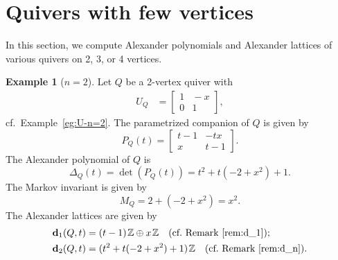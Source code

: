 \documentclass[11pt, letterpaper]{amsart}
\theoremstyle{definition}
\newtheorem{example}[theorem]{Example}
\numberwithin{equation}{section}
\def\ZZ{{\mathbb Z}}
\def\dd{{\mathbf{d}}}
\begin{document}
\newpage

\section{Quivers with few vertices}
\label{sec:alex-examples}

In this section, we compute Alexander polynomials and Alexander lattices of various quivers on 2, 3, or 4 vertices. 

\begin{example}[$n=2$]
Let $Q$ be a 2-vertex quiver with 
\begin{align*}
U_Q&=\begin{bmatrix} 
1 &  \! \!-x  \\
0 &  \! \!1 
\end{bmatrix}, 
\end{align*}
cf.\ Example~\ref{eg:U-n=2}.
The parametrized companion of $Q$ is given by 
\begin{equation*}
P_Q(t)=\begin{bmatrix} 
t-1 &  -tx  \\
x &  t-1 
\end{bmatrix}. 
\end{equation*}
The Alexander polynomial of $Q$ is
\begin{equation}
\label{eq:alex-n=2}
\Delta_Q(t)=\det(P_Q(t))=t^2+t(-2+x^2)+1. 
\end{equation}
The Markov invariant is given by 
\begin{equation}
\label{eq:markov-n=2}
M_Q=2+(-2+x^2)=x^2. 
\end{equation}
The Alexander lattices are given by 
\begin{align*}
\dd_1(Q,t) &= (t-1)\hspace{1pt}\ZZ \oplus x\hspace{1pt}\ZZ \quad \text{(cf.\ Remark~\ref{rem:d_1})};\\
\dd_2(Q,t) &=(t^2+t(-2+x^2)+1)\hspace{1pt}\ZZ \quad \text{(cf.\ Remark~\ref{rem:d_n}).}
\end{align*}

\end{example}
\end{document}
